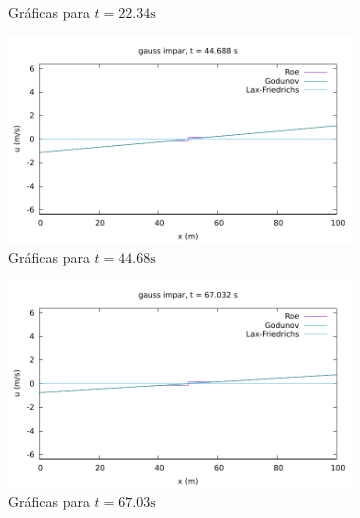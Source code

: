\documentclass[12pt]{article}
\begin{document}
\begin{figure}[h!]
\begin{subfigure}{0.49\textwidth}
			\caption*{Gráficas para $t=22.34\unit{\second}$}
			\label{fig:gauss_impar-perio2}
		\end{subfigure}\par
		\begin{subfigure}{0.49\textwidth}
			\centering
			\includegraphics[width=\textwidth]{../burgers1DVF/results/sol_periodicas/gauss_impar/042.pdf}
			\caption*{Gráficas para $t=44.68\unit{\second}$}
			\label{fig:gauss_impar-perio3}
		\end{subfigure}\hfill
		\begin{subfigure}{0.49\textwidth}
			\centering
			\includegraphics[width=\textwidth]{../burgers1DVF/results/sol_periodicas/gauss_impar/063.pdf}
			\caption*{Gráficas para $t=67.03\unit{\second}$}
			\label{fig:gauss_impar-perio4}
		\end{subfigure}\par
		\begin{subfigure}{0.49\textwidth}
			\centering

\end{subfigure}
\end{figure}
\end{document}

